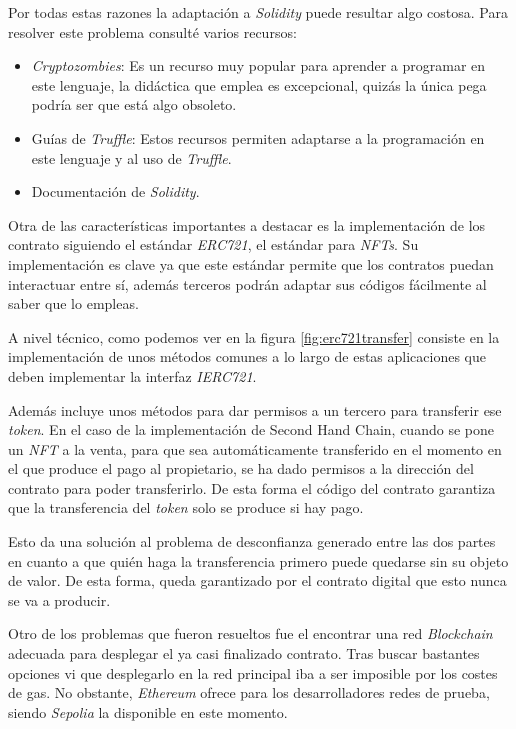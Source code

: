 Por todas estas razones la adaptación a \textit{Solidity} puede resultar algo costosa. Para resolver este problema consulté varios recursos:
\begin{itemize}
    \item \textit{Cryptozombies}\cite{cryptozombiesCryptoZombiesAprende}: Es un recurso muy popular para aprender a programar en este lenguaje, la didáctica que emplea es excepcional, quizás la única pega podría ser que está algo obsoleto.
    \item Guías de \textit{Truffle}\cite{trufflePetShop}: Estos recursos permiten adaptarse a la programación en este lenguaje y al uso de \textit{Truffle}.
    \item Documentación de \textit{Solidity}.
\end{itemize}

Otra de las características importantes a destacar es la implementación de los contrato siguiendo el estándar \textit{ERC721}\cite{erc721}, el estándar para \textit{NFTs}. Su implementación es clave ya que este estándar permite que los contratos puedan interactuar entre sí, además terceros podrán adaptar sus códigos fácilmente al saber que lo empleas.


A nivel técnico, como podemos ver en la figura \ref{fig:erc721transfer} consiste en la implementación de unos métodos comunes a lo largo de estas aplicaciones que deben implementar la interfaz \textit{IERC721}.

Además incluye unos métodos para dar permisos a un tercero para transferir ese \textit{token}. En el caso de la implementación de Second Hand Chain, cuando se pone un \textit{NFT} a la venta, para que sea automáticamente transferido en el momento en el que produce el pago al propietario, se ha dado permisos a la dirección del contrato para poder transferirlo. De esta forma el código del contrato garantiza que la transferencia del \textit{token} solo se produce si hay pago.

Esto da una solución al problema de desconfianza generado entre las dos partes en cuanto a que quién haga la transferencia primero puede quedarse sin su objeto de valor. De esta forma, queda garantizado por el contrato digital que esto nunca se va a producir.

Otro de los problemas que fueron resueltos fue el encontrar una red \textit{Blockchain} adecuada para desplegar el ya casi finalizado contrato. Tras buscar bastantes opciones vi que desplegarlo en la red principal iba a ser imposible por los costes de gas. No obstante, \textit{Ethereum} ofrece para los desarrolladores redes de prueba, siendo \textit{Sepolia} la disponible en este momento.

